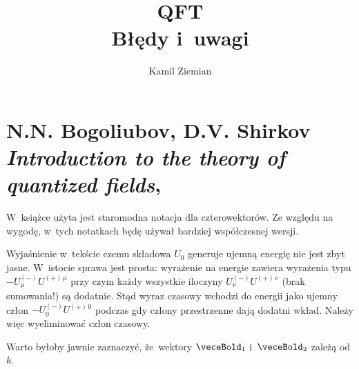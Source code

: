\documentclass[a4paper,11pt]{article}
\title{QFT \\
  {\Large Błędy i~uwagi}}
\author{Kamil Ziemian}
\numberwithin{equation}{section}
\begin{document}





\maketitle





\section{N.N. Bogoliubov, D.V. Shirkov \\
  \textit{Introduction to the theory of quantized fields},
  \cite{BogoliubovShirkovIntroductionToTheoryOfQuantiezedFields1959}}


\vspace{0em}



\vspace{0em}


\noindent
W~książce użyta jest staromodna notacja dla czterowektorów. Ze względu
na wygodę, w~tych notatkach będę używał bardziej współczesnej wersji.







\noindent
{} Wyjaśnienie w~tekście czemu składowa $U_{ 0 }$ generuje
ujemną energię nie jest zbyt jasne. W~istocie sprawa jest prosta:
wyrażenie na energie zawiera wyrażenia typu
$-U^{ ( - ) }_{ \mu } U^{ ( + ) \, \mu }$ przy czym każdy wszystkie
iloczyny $U^{ ( - ) }_{ \nu } U^{ ( + )\, \nu }$ (brak sumowania!) są
dodatnie. Stąd wyraz czasowy wchodzi do energii jako ujemny człon
$-U^{ ( - ) }_{ 0 } U^{ ( + )\, 0 }$ podczas gdy człony przestrzenne
dają dodatni wkład. Należy więc wyeliminować człon czasowy.

\VerSpaceFour





\noindent
{} Warto byłoby jawnie zaznaczyć, że~wektory $\veceBold_{ 1 }$
i~$\veceBold_{ 2 }$ zależą od $k$.
\end{document}
